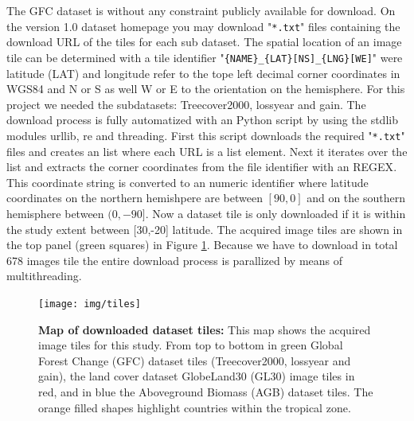 
			The \citeauthor{Hansen2013} \ac{GFC} dataset is without any constraint publicly available for download. On the version 1.0 dataset homepage you may download "\verb|*.txt|" files containing the download \ac{URL} of the tiles for each sub dataset. The spatial location of an image tile can be determined with a tile identifier "\verb|{NAME}_{LAT}[NS]_{LNG}[WE]|" were latitude (LAT) and longitude refer to the tope left decimal corner coordinates in \ac{WGS84} and N or S as well W or E to the orientation on the hemisphere. For this project we needed the subdatasets: Treecover2000, lossyear and gain. The download process is fully automatized with an Python script by using the \ac{stdlib} modules urllib, re and threading. First this script downloads the required "\verb|*.txt|" files and creates an list where each \ac{URL} is a list element. Next it iterates over the list and extracts the corner coordinates from the file identifier with an \ac{REGEX}. This coordinate string is converted to an numeric identifier where latitude coordinates on the northern hemishpere are between $[90,0]$ and on the southern hemisphere between $(0,-90]$. Now a dataset tile is only downloaded if it is within the study extent between [30,-20] latitude. The acquired image tiles are shown in the top panel (green squares) in Figure \ref{fig:tiles}. Because we have to download in total 678 images tile the entire download process is parallized by means of multithreading.
			\begin{figure}[ht]
				\centering
				\texttt{[image: img/tiles]}
				\caption[Map of downloaded dataset tiles]{\textbf{Map of downloaded dataset tiles:} This map shows the acquired image tiles for this study. From top to bottom in green Global Forest Change (GFC) dataset tiles (Treecover2000, lossyear and gain), the land cover dataset GlobeLand30 (GL30) image tiles in red, and in blue the Aboveground Biomass (AGB) dataset tiles. The orange filled shapes highlight countries within the tropical zone.}
				\label{fig:tiles}
			\end{figure}


